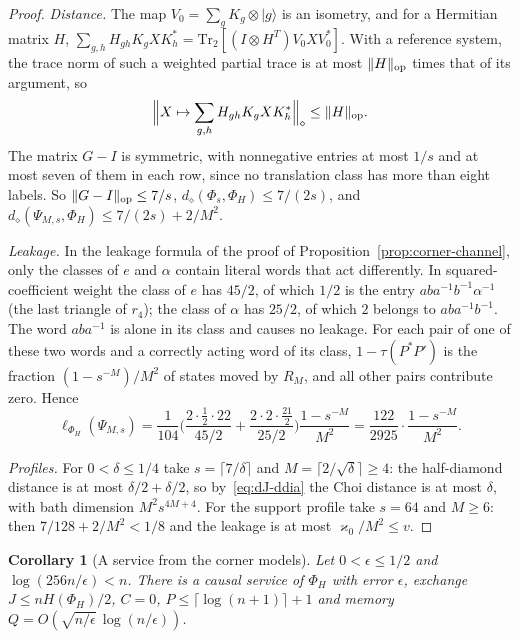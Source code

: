 \documentclass[11pt,a4paper]{article}
\theoremstyle{plain}
\newtheorem{corollary}[theorem]{Corollary}
\theoremstyle{definition}
\theoremstyle{remark}
\newcommand{\ddia}{d_\diamond}
\begin{document}
\begin{proof}
\emph{Distance.} The map $V_0=\sum_gK_g\otimes|g\rangle$ is an isometry, and for a Hermitian matrix $H$,
$\sum_{g,h}H_{gh}K_gXK_h^*=\mathrm{Tr}_2[(I\otimes H^{T})V_0XV_0^*]$. With a reference system, the trace norm of such a weighted partial
trace is at most $\|H\|_{\rm op}$ times that of its argument, so
\begin{equation}\label{eq:gram-diamond}
\Big\|X\mapsto\sum_{g,h}H_{gh}K_gXK_h^*\Big\|_\diamond\le\|H\|_{\rm op}.
\end{equation}
The matrix $G-I$ is symmetric, with nonnegative entries at most $1/s$ and at most seven of them in each row, since no translation class
has more than eight labels. So $\|G-I\|_{\rm op}\le7/s$, $\ddia(\Phi_s,\Phi_H)\le7/(2s)$, and
$\ddia(\Psi_{M,s},\Phi_H)\le7/(2s)+2/M^2$.

\emph{Leakage.} In the leakage formula of the proof of Proposition~\ref{prop:corner-channel}, only the classes of $e$ and $\alpha$ contain literal
words that act differently. In squared-coefficient weight the class of $e$ has $45/2$, of which $1/2$ is the entry
$aba^{-1}b^{-1}\alpha^{-1}$ (the last triangle of $r_4$); the class of $\alpha$ has $25/2$, of which $2$ belongs to $aba^{-1}b^{-1}$. The
word $aba^{-1}$ is alone in its class and causes no leakage. For each pair of one of these two words and a correctly acting word of its
class, $1-\tau(P^*P')$ is the fraction $(1-s^{-M})/M^2$ of states moved by $R_M$, and all other pairs contribute zero. Hence
\[
\ell_{\Phi_H}(\Psi_{M,s})=\frac1{104}\Big(\frac{2\cdot\frac12\cdot22}{45/2}+\frac{2\cdot2\cdot\frac{21}2}{25/2}\Big)\frac{1-s^{-M}}{M^2}
=\frac{122}{2925}\cdot\frac{1-s^{-M}}{M^2}.
\]

\emph{Profiles.} For $0<\delta\le1/4$ take $s=\lceil7/\delta\rceil$ and $M=\lceil2/\sqrt\delta\rceil\ge4$: the half-diamond distance is
at most $\delta/2+\delta/2$, so by~\eqref{eq:dJ-ddia} the Choi distance is at most $\delta$, with bath dimension $M^2s^{4M+4}$. For the
support profile take $s=64$ and $M\ge6$: then $7/128+2/M^2<1/8$ and the leakage is at most $\varkappa_0/M^2\le v$.
\end{proof}

\begin{corollary}[A service from the corner models]\label{cor:corner-service}
Let $0<\epsilon\le1/2$ and $\log(256n/\epsilon)<n$. There is a causal service of $\Phi_H$ with error $\epsilon$, exchange
$J\le nH(\Phi_H)/2$, $C=0$, $P\le\lceil\log(n+1)\rceil+1$ and memory $Q=O(\sqrt{n/\epsilon}\,\log(n/\epsilon))$.
\end{corollary}
\end{document}
